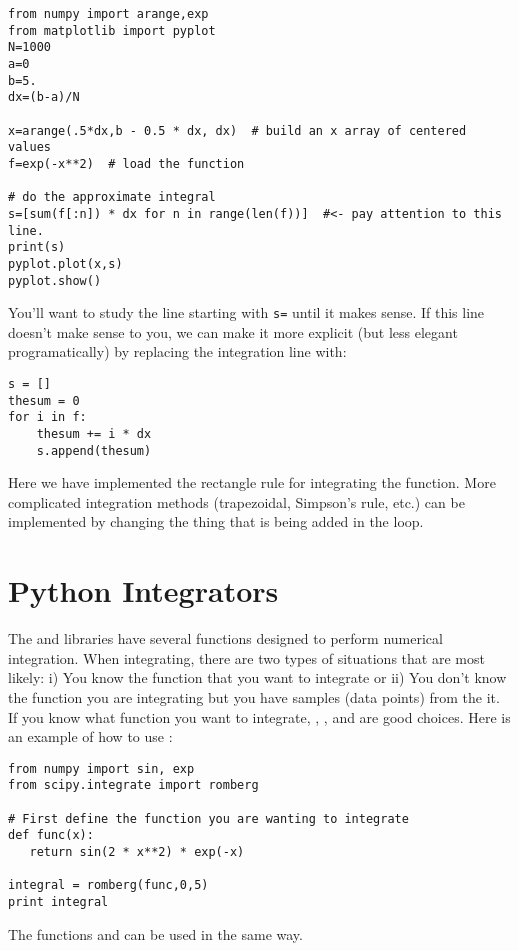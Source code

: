 \begin{Verbatim}
from numpy import arange,exp
from matplotlib import pyplot
N=1000
a=0
b=5.
dx=(b-a)/N

x=arange(.5*dx,b - 0.5 * dx, dx)  # build an x array of centered values
f=exp(-x**2)  # load the function

# do the approximate integral
s=[sum(f[:n]) * dx for n in range(len(f))]  #<- pay attention to this line.
print(s)
pyplot.plot(x,s)
pyplot.show()
\end{Verbatim}
You'll want to study the line starting with \verb!s=! until it makes
sense.  If this line doesn't make sense to you, we can make it more
explicit (but less elegant programatically) by replacing the
integration line with:
\begin{Verbatim}
s = []
thesum = 0
for i in f:
    thesum += i * dx
    s.append(thesum)
\end{Verbatim}

Here we have implemented the rectangle rule for integrating the function.
More complicated integration methods (trapezoidal, Simpson's rule,
etc.) can be implemented by changing the thing that is being added in
the loop.

\section{Python Integrators}
The  and  libraries have several functions
designed to perform numerical integration.  When integrating, there
are two types of situations that are most likely: i) You know the
function that you want to integrate or ii) You don't know the
function you are integrating but you have samples (data points) from the it.
If you know what function you want to integrate,
,
, and  are good choices.  Here is an
example of how to use :  
\begin{Verbatim}
from numpy import sin, exp
from scipy.integrate import romberg

# First define the function you are wanting to integrate
def func(x):
   return sin(2 * x**2) * exp(-x)

integral = romberg(func,0,5)
print integral
\end{Verbatim}
The functions  and  can be used in the
same way.  

